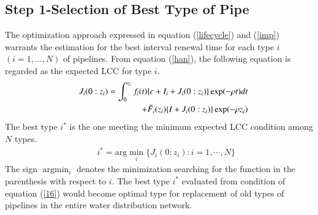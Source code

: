\documentclass[a4paper,oneside,onecolumn,preprint,10pt,authoryear]{elsarticle}
\begin{document}
\subsection{Step 1-Selection of Best Type of Pipe}
\label{571}
The optimization approach expressed in equation (\ref{lifecycle}) and (\ref{imp}) warrants the estimation for the best interval renewal time for each type $i$ $(i=1,...,N)$ of pipelines. From equation (\ref{han}), the following equation is regarded as the expected LCC for type $i$.
\begin{eqnarray}
&& J_i(0:z_i)= \int_0^{z_i} f_i(t)\{c+I_i+J_i(0:z_i)\} \exp(-\rho t)dt  \nonumber \\
&& \hspace{10mm} + \tilde{F}_i(z_i)\{I+J_i(0:z_i)\} \exp(-\rho z_i)  \label{han1}
\end{eqnarray}
The best type $i^*$ is the one meeting the minimum expected LCC condition among $N$ types. 
\begin{eqnarray}
&& i^\ast=\mbox{arg} \min_{i}\{J_i(0:z_i):i=1,\cdots,N\} \label{16}
\end{eqnarray}
The sign $\mbox{arg}\min_{i}$ denotes the minimization searching for the function in the parenthesis with respect to $i$. The best type $i^*$ evaluated from condition of equation (\ref{16}) would become optimal type for replacement of old types of pipelines in the entire water distribution network.
\end{document}

